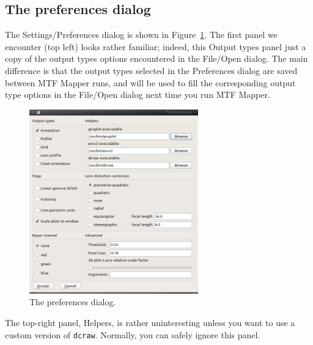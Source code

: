 \documentclass[a4paper]{article}
\begin{document}
\subsection{The preferences dialog}
\label{sec:settings}
The \textsf{Settings/Preferences} dialog is shown in
Figure~\ref{fig:settings}. The first panel we encounter (top left) looks
rather familiar; indeed, this \textsf{Output types} panel just a copy of the output
types options encountered in the \textsf{File/Open} dialog. The main
difference is that the output types selected in the \textsf{Preferences}
dialog are saved between MTF Mapper runs, and will be used to fill the corresponding
output type options in the \textsf{File/Open} dialog next time you run MTF
Mapper.

\begin{figure}[ht!]
\centering
\includegraphics[width=0.65\textwidth]{figures/settings}
\caption{The preferences dialog.}
\label{fig:settings}
\end{figure}

The top-right panel, \textsf{Helpers}, is rather uninteresting unless you
want to use a custom version of \texttt{dcraw}. Normally, you can safely
ignore this panel.
\end{document}
